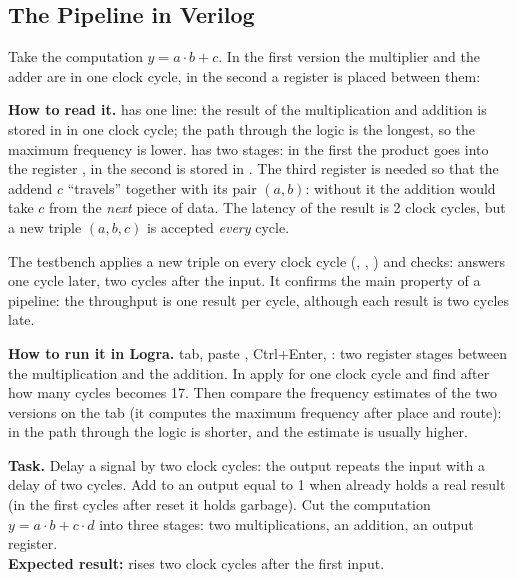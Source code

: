 \subsection{The Pipeline in Verilog}
\label{sec:sync-pipe-v}

Take the computation $y=a\cdot b+c$. In the first version the multiplier and the
adder are in one clock cycle, in the second a register is placed between them:



\textbf{How to read it.}  has one line: the result of the
multiplication and addition is stored in  in one clock cycle; the path
through the logic is the longest, so the maximum frequency is lower. 
has two stages: in the first the product goes into the register , in
the second  is stored in . The third register 
is needed so that the addend $c$ ``travels'' together with its pair $(a,b)$:
without it the addition would take $c$ from the \emph{next} piece of data. The
latency of the result is 2 clock cycles, but a new triple $(a,b,c)$ is accepted
\emph{every} cycle.

The testbench  applies a new triple on every clock cycle
(, , ) and checks:  answers one
cycle later,  two cycles after the input. It confirms the main
property of a pipeline: the throughput is one result per cycle, although each
result is two cycles late.

\textbf{How to run it in Logra.}  tab, paste , Ctrl+Enter,
: two register stages between the multiplication and the addition. In
 apply  for one clock cycle and find after how
many cycles  becomes 17. Then compare the frequency estimates of the two
versions on the  tab (it computes the maximum frequency after place
and route): in  the path through the logic is shorter, and the
estimate is usually higher.

\begin{diybox}
\textbf{Task.}  Delay a signal by two clock cycles: the output repeats
the input with a delay of two cycles.  Add to  an output
 equal to 1 when  already holds a real result (in the first
cycles after reset it holds garbage).  Cut the computation
$y=a\cdot b+c\cdot d$ into three stages: two multiplications, an addition, an
output register.\\
\textbf{Expected result:}  rises two clock cycles after the first
input.
\end{diybox}


